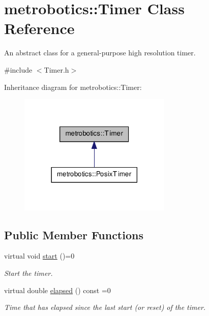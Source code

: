 \hypertarget{classmetrobotics_1_1Timer}{\section{metrobotics\-:\-:\-Timer \-Class \-Reference}
\label{classmetrobotics_1_1Timer}
}


\-An abstract class for a general-\/purpose high resolution timer.  




{\ttfamily \#include $<$\-Timer.\-h$>$}



\-Inheritance diagram for metrobotics\-:\-:\-Timer\-:
\nopagebreak
\begin{figure}[H]
\begin{center}
\leavevmode
\includegraphics[width=206pt]{classmetrobotics_1_1Timer__inherit__graph}
\end{center}
\end{figure}
\subsection*{\-Public \-Member \-Functions}
\begin{DoxyCompactItemize}
\item 
virtual void \hyperlink{classmetrobotics_1_1Timer_afac918d950d5760a630913791b33fa9a}{start} ()=0
\begin{DoxyCompactList}\small\item\em \-Start the timer. \end{DoxyCompactList}\item 
virtual double \hyperlink{classmetrobotics_1_1Timer_ac199bd3a173404eac505e2ed978d7169}{elapsed} () const =0
\begin{DoxyCompactList}\small\item\em \-Time that has elapsed since the last start (or reset) of the timer. \end{DoxyCompactList}\end{DoxyCompactItemize}
